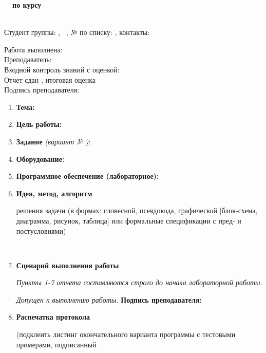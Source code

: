 \pagestyle{main}
\begin{large}
	\textbf{\DocName \ \Number \ по курсу \CourseName}
\end{large}	
\\
Студент группы: \Group, \ \Name, № по списку: \StudentNumber, контакты: \Contacts
\begin{flushright}
	Работа выполнена: \CompletionDate \\
	Преподаватель: \Lecturer \\
	Входной контроль знаний с оценкой: \\
	Отчет сдан \ReportDate, итоговая оценка \Mark \\
	Подпись преподавателя: \Signature
\end{flushright}
\begin{enumerate}
	\item \textbf{Тема:} \ \Theme
	\item \textbf{Цель работы: } \Target
	\item \textbf{Задание} \textit{(вариант № \StudentNumber)}: \Task
	\item \textbf{Оборудование:} \\ \Equipment
	\item \textbf{Программное обеспечение (лабораторное):} \\ \Software
	\item \textbf{Идея, метод, алгоритм} 
	\begin{footnotesize}
		решения задачи (в формах: словесной, псевдокода, графической [блок-схема, диаграмма, рисунок, таблица] или формальные спецификации с пред- и постусловиями)
	\end{footnotesize} 
	\\ \Idea
	\item \textbf{Сценарий выполнения работы}
	\begin{footnotesize}
	\end{footnotesize}
	\Plan
	\textit{Пункты 1-7 отчета составляются строго до начала лабораторной работы.}
	\begin{flushright}
		\textit{Допущен к выполнению работы.} \textbf{Подпись преподавателя:} 
	\end{flushright}
	\item \textbf{Распечатка протокола}
	\begin{footnotesize}
		(подклеить листинг окончательного варианта программы с тестовыми примерами, подписанный

\end{footnotesize}
\end{enumerate}
